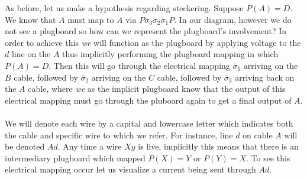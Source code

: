     As before, let us make a hypothesis regarding steckering. Suppose $P(A) = D$. We know that $A$ must map to $A$ via 
    $P\overline\sigma_3\overline\sigma_2\overline\sigma_1 P$. In our diagram, however we do not see a plugboard so how can we represent the plugboard's involvement? In order 
    to achieve this \emph{we} will function as the plugboard by applying voltage to the $d$ line on the $A$ thus implicitly performing the plugboard mapping in which $P(A) = D$. 
    Then this will go through the electrical mapping $\overline\sigma_1$ arriving on the $B$ cable, followed by $\overline\sigma_2$ arriving on the $C$ cable, followed by $\overline\sigma_3$ arriving back on the $A$ cable, where \emph{we} as the implicit plugboard know that 
    the output of this electrical mapping must go through the pluboard again to get a final output of $A$.
    \\\\We will denote each wire by a capital and lowercase letter which indicates both the cable and specific wire to which we refer. For instance, line $d$ on cable $A$ will be denoted $Ad$. Any time a wire 
    $Xy$ is live, implicitly this means that there is an intermediary plugboard which mapped $P(X) = Y$ or $P(Y) = X$. 
    To see this electrical mapping occur let us visualize a current being sent through $Ad$.
